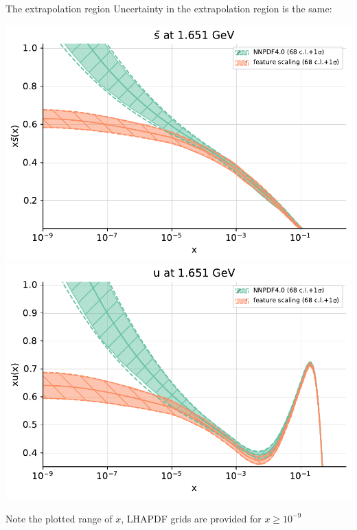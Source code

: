 \documentclass[aspectratio=169,11pt]{beamer}
\begin{document}
\begin{frame}[t]{The extrapolation region}
  Uncertainty in the extrapolation region is the same:\\
  \begin{center}
    \includegraphics[height=0.5\textheight]{figures/pdf_extra_sbar_feature_vs_nnpdf40.pdf}
    \includegraphics[height=0.5\textheight]{figures/pdf_extra_u_feature_vs_nnpdf40.pdf}
  \end{center}
  Note the plotted range of $x$, LHAPDF grids are provided for $x\geq 10^{-9}$
\end{frame}
\end{document}
